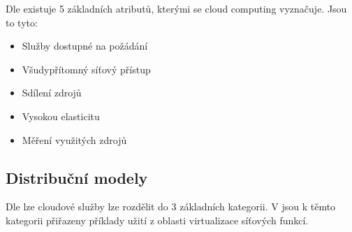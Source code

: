 Dle \cite{Cloud_book} existuje 5 základních atributů, kterými se cloud computing vyznačuje. Jsou to tyto:

\begin{itemize}
\item Služby dostupné na požádání
\item Všudypřítomný síťový přístup
\item Sdílení zdrojů
\item Vysokou elasticitu
\item Měření využitých zdrojů
\end{itemize}

\subsection{Distribuční modely}

Dle \cite{CloudSurvey} lze cloudové služby lze rozdělit do 3 základních kategorii. V \cite{NFV_use_cases} jsou k těmto kategorii přiřazeny příklady užití z oblasti virtualizace síťových funkcí. 

